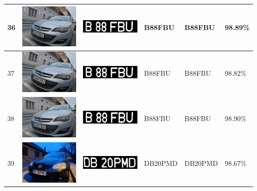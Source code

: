 \documentclass[a4paper,12pt]{report}
\begin{document}
\begin{longtable}{| m{0.6cm} | m{3cm} | m{3cm} | m{1.8cm} | m{1.8cm} | m{1.8cm} |}
    36  & \includegraphics[width=3cm,keepaspectratio]{dataset/21_d1.jpg}  & \includegraphics[width=3cm,keepaspectratio]{segmentari/36.jpg}  & B88FBU              & B88FBU               & 98.89\%    \\ \hline
    37  & \includegraphics[width=3cm,keepaspectratio]{dataset/21_d2.jpg}  & \includegraphics[width=3cm,keepaspectratio]{segmentari/37.jpg}  & B88FBU              & B88FBU               & 98.82\%    \\ \hline
    38  & \includegraphics[width=3cm,keepaspectratio]{dataset/21_d3.jpg}  & \includegraphics[width=3cm,keepaspectratio]{segmentari/38.jpg}  & B88FBU              & B88FBU               & 98.90\%    \\ \hline
    39  & \includegraphics[width=3cm,keepaspectratio]{dataset/22_d1.jpg}  & \includegraphics[width=3cm,keepaspectratio]{segmentari/39.jpg}  & DB20PMD             & DB20PMD              & 98.67\%    \\ \hline

\end{longtable}
\end{document}
